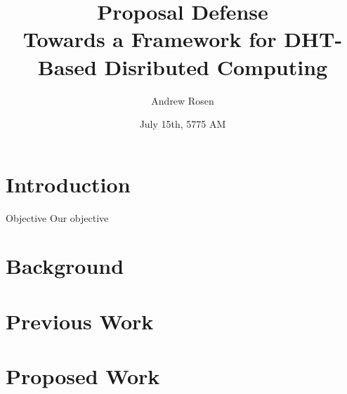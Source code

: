\documentclass[11pt]{beamer}
\author{Andrew Rosen}
\title[DHT Based Distributed Computing]{Proposal Defense\\ Towards a Framework for DHT-Based Disributed Computing}
\institute{Georgia State University}
\date{July 15th, 5775 AM}
\begin{document}
\maketitle

\begin{frame}
	\frametitle{}
\end{frame}


\section{Introduction}

\begin{frame}{Objective}
Our objective

\end{frame}

\section{Background}


\section{Previous Work}

\section{Proposed Work}
\end{document}
